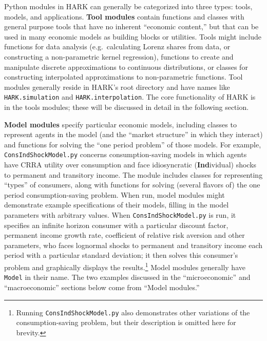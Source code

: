 \documentclass[10pt,twocolumn]{article}
\let\rmarkdownfootnote\footnote%
\def\footnote{\protect\rmarkdownfootnote}
\begin{document}
Python modules in HARK can generally be categorized into three types: tools, models, and applications. \textbf{Tool modules} contain functions and classes with general purpose tools that have no inherent ``economic content,'' but that can be used in many economic models as building blocks or utilities. Tools might include functions for data analysis (e.g.~calculating Lorenz shares from data, or constructing a non-parametric kernel regression), functions to create and manipulate discrete approximations to continuous distributions, or classes for constructing interpolated approximations to non-parametric functions.  Tool modules generally reside in HARK's root directory and have names like \texttt{HARK.simulation} and \texttt{HARK.interpolation}. The core functionality of HARK is in the tools modules; these will be discussed in detail in the following section.

\textbf{Model modules} specify particular economic models, including classes to represent agents in the model (and the ``market structure'' in which they interact) and functions for solving the ``one period problem'' of those models. For example, \texttt{ConsIndShockModel.py} concerns consumption-saving models in which agents have CRRA utility over consumption and face idiosyncratic ({\bf Ind}ividual) shocks to permanent and transitory income. The module includes classes for representing ``types'' of consumers, along with functions for solving (several flavors of) the one period consumption-saving problem. When run, model modules might demonstrate example specifications of their models, filling in the model parameters with arbitrary values. When \texttt{ConsIndShockModel.py} is run, it specifies an infinite horizon consumer with a particular discount factor, permanent income growth rate, coefficient of relative risk aversion and other parameters, who faces lognormal shocks to permanent and transitory income each period with a particular standard deviation; it then solves this consumer's problem and graphically displays the results.\footnote{Running \texttt{ConsIndShockModel.py} also demonstrates other variations of the consumption-saving problem, but their description is omitted here for brevity.} Model modules generally have \texttt{Model} in their name. The two examples discussed in the ``microeconomic'' and ``macroeconomic'' sections below come from ``Model modules.''
\end{document}
